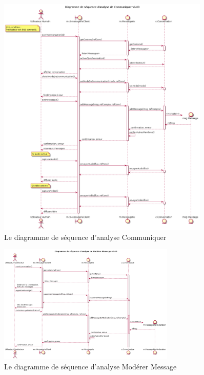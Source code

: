 \documentclass[11pt,dvipsnames,svgnames]{report}
\begin{document}
\begin{figure}[H]
\centerline{\includegraphics[width=0.9\textwidth]{diagrammes/dsa-communiquer.png}}
\caption{Le diagramme de séquence d'analyse \og Communiquer \fg}
\end{figure}

\begin{figure}[H]
\centerline{\includegraphics[width=0.75\textwidth]{diagrammes/dsa-moderer.png}}
\caption{Le diagramme de séquence d'analyse \og Modérer Message \fg}
\end{figure}

\newpage
\end{document}
